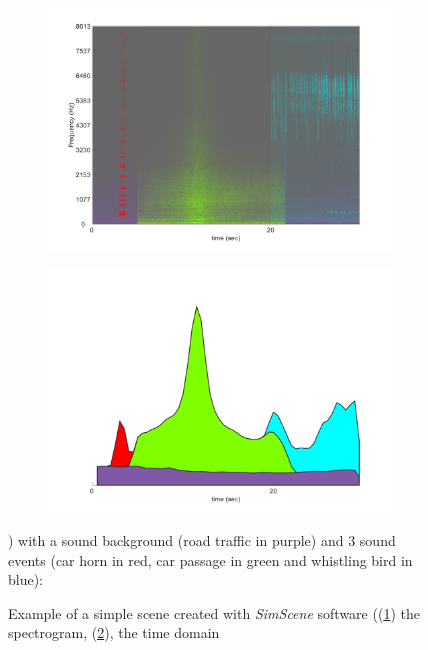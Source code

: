 \documentclass[twocolumn,a4paper,10pt]{article}
\begin{document}
\begin{figure}[t]
    \centering
    \begin{subfigure}[t]{0.47\linewidth}
        \centering
       \includegraphics[width=\linewidth]{./figures/exempleSimScene3-spectrum.png}
       \caption{}
       \label{fig:simScene_spec}
    \end{subfigure}%
    \hfill
    \begin{subfigure}[t]{0.47\linewidth}
        \centering
       \includegraphics[width=\linewidth]{./figures/exempleSimScene3-timeDomain.png}
       \caption{}
       \label{fig:simScene_time}
    \end{subfigure}
    \caption{Example of a simple scene created with \textit{SimScene} software ((\ref{fig:simScene_spec}) the spectrogram, (\ref{fig:simScene_time}), the time domain}) with a sound background (road traffic in purple) and 3 sound events (car horn in red, car passage in green and whistling bird in blue):
    \label{fig:example_simScene}
\end{figure}
\end{document}
